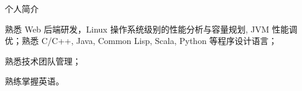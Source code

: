 \documentclass{resume} %
\begin{document}
\begin{rSection}{个人简介}
  \item 熟悉 Web 后端研发，Linux 操作系统级别的性能分析与容量规划, JVM 性能调优；熟悉 C/C++, Java, Common Lisp, Scala, Python 等程序设计语言；
  \item 熟悉技术团队管理；
  \item 熟练掌握英语。
\end{rSection}





\end{document}
